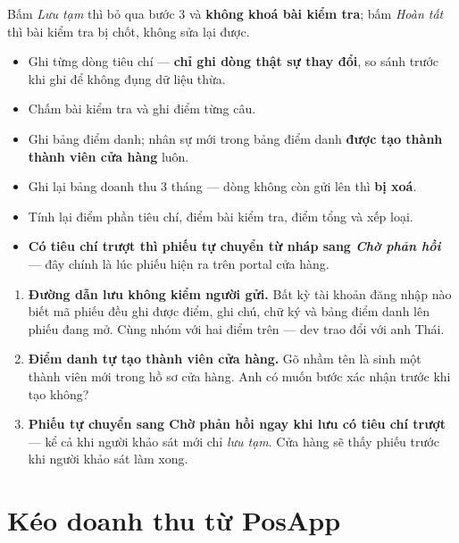 Bấm \emph{Lưu tạm} thì bỏ qua bước 3 và \textbf{không khoá bài kiểm tra}; bấm \emph{Hoàn tất}
thì bài kiểm tra bị chốt, không sửa lại được.

\mghi

\begin{itemize}[leftmargin=*]
  \item Ghi từng dòng tiêu chí --- \textbf{chỉ ghi dòng thật sự thay đổi}, so sánh trước khi
        ghi để không đụng dữ liệu thừa.
  \item Chấm bài kiểm tra và ghi điểm từng câu.
  \item Ghi bảng điểm danh; nhân sự mới trong bảng điểm danh \textbf{được tạo thành thành viên
        cửa hàng} luôn.
  \item Ghi lại bảng doanh thu 3 tháng --- dòng không còn gửi lên thì \textbf{bị xoá}.
  \item Tính lại điểm phần tiêu chí, điểm bài kiểm tra, điểm tổng và xếp loại.
  \item \textbf{Có tiêu chí trượt thì phiếu tự chuyển từ nháp sang \emph{Chờ phản hồi}} ---
        đây chính là lúc phiếu hiện ra trên portal cửa hàng.
\end{itemize}

\mhoi

\begin{ask}
\begin{enumerate}[leftmargin=*]
  \item \textbf{Đường dẫn lưu không kiểm người gửi.} Bất kỳ tài khoản đăng nhập nào biết mã
        phiếu đều ghi được điểm, ghi chú, chữ ký và bảng điểm danh lên phiếu đang mở. Cùng nhóm
        với hai điểm trên --- dev trao đổi với anh Thái.
  \item \textbf{Điểm danh tự tạo thành viên cửa hàng.} Gõ nhầm tên là sinh một thành viên mới
        trong hồ sơ cửa hàng. Anh có muốn bước xác nhận trước khi tạo không?
  \item \textbf{Phiếu tự chuyển sang Chờ phản hồi ngay khi lưu có tiêu chí trượt} --- kể cả khi
        người khảo sát mới chỉ \emph{lưu tạm}. Cửa hàng sẽ thấy phiếu trước khi người khảo sát
        làm xong.
\end{enumerate}
\end{ask}

\section{Kéo doanh thu từ PosApp}
\medskip

